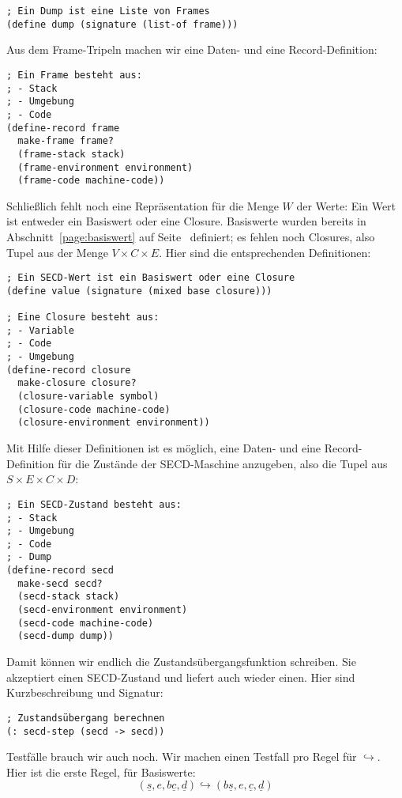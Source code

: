 %
\begin{lstlisting}
; Ein Dump ist eine Liste von Frames
(define dump (signature (list-of frame)))
\end{lstlisting}
%
Aus dem Frame-Tripeln machen wir eine Daten- und eine Record-Definition:
%
\begin{lstlisting}
; Ein Frame besteht aus:
; - Stack
; - Umgebung
; - Code
(define-record frame
  make-frame frame?
  (frame-stack stack)
  (frame-environment environment)
  (frame-code machine-code))
\end{lstlisting}
%
Schließlich fehlt noch eine Repräsentation für die Menge $W$ der
Werte: Ein Wert ist entweder ein Basiswert oder eine Closure.
Basiswerte wurden bereits in Abschnitt~\ref{page:basiswert} auf
Seite~\pageref{page:basiswert} definiert; es fehlen noch
Closures, also Tupel aus der Menge $V\times C\times E$.  Hier sind die
entsprechenden Definitionen:
%
\begin{lstlisting}
; Ein SECD-Wert ist ein Basiswert oder eine Closure
(define value (signature (mixed base closure)))

; Eine Closure besteht aus:
; - Variable
; - Code
; - Umgebung
(define-record closure
  make-closure closure?
  (closure-variable symbol)
  (closure-code machine-code)
  (closure-environment environment))
\end{lstlisting}
%
Mit Hilfe dieser Definitionen ist es möglich, eine Daten- und eine
Record-Definition für die Zustände der SECD-Maschine anzugeben, also
die Tupel aus $S\times E\times C\times D$:
%
\begin{lstlisting}
; Ein SECD-Zustand besteht aus:
; - Stack
; - Umgebung
; - Code
; - Dump
(define-record secd
  make-secd secd?
  (secd-stack stack)
  (secd-environment environment)
  (secd-code machine-code)
  (secd-dump dump))
\end{lstlisting}
%
Damit können wir endlich die Zustandsübergangsfunktion schreiben.  Sie
akzeptiert einen SECD-Zustand und liefert auch wieder einen.  Hier
sind Kurzbeschreibung und Signatur:
%
\begin{lstlisting}
; Zustandsübergang berechnen
(: secd-step (secd -> secd))
\end{lstlisting}
%
Testfälle brauch wir auch noch.  Wir machen einen Testfall pro Regel
für $\hookrightarrow$.  Hier ist die erste Regel, für Basiswerte:
%
\begin{displaymath}
  (\underline{s}, e, b\underline{c}, \underline{d})
  \hookrightarrow
  (b\underline{s}, e, \underline{c}, \underline{d})
\end{displaymath}
